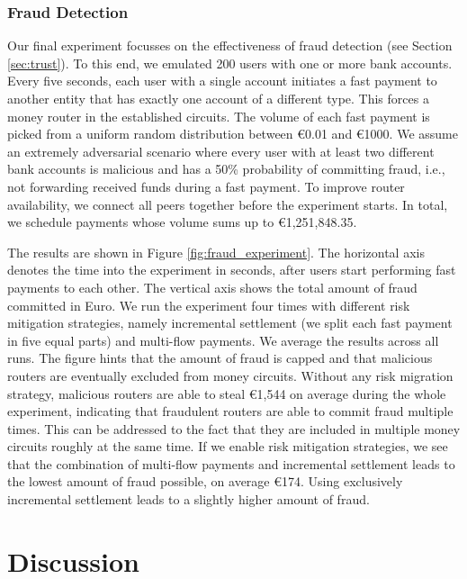 \subsubsection*{Fraud Detection}
\label{sec:fraud_experiment}
Our final experiment focusses on the effectiveness of fraud detection (see Section \ref{sec:trust}). %
To this end, we emulated 200 users with one or more bank accounts.
Every five seconds, each user with a single account initiates a fast payment to another entity that has exactly one account of a different type.
This forces a money router in the established circuits.
The volume of each fast payment is picked from a uniform random distribution between \euro 0.01 and \euro 1000.
We assume an extremely adversarial scenario where every user with at least two different bank accounts is malicious and has a 50\% probability of committing fraud, i.e., not forwarding received funds during a fast payment.
To improve router availability, we connect all peers together before the experiment starts.
In total, we schedule payments whose volume sums up to \euro 1,251,848.35.

The results are shown in Figure \ref{fig:fraud_experiment}.
The horizontal axis denotes the time into the experiment in seconds, after users start performing fast payments to each other.
The vertical axis shows the total amount of fraud committed in Euro.
We run the experiment four times with different risk mitigation strategies, namely incremental settlement (we split each fast payment in five equal parts) and multi-flow payments.
We average the results across all runs.
The figure hints that the amount of fraud is capped and that malicious routers are eventually excluded from money circuits.
Without any risk migration strategy, malicious routers are able to steal \euro 1,544 on average during the whole experiment, indicating that fraudulent routers are able to commit fraud multiple times.
This can be addressed to the fact that they are included in multiple money circuits roughly at the same time. 
If we enable risk mitigation strategies, we see that the combination of multi-flow payments and incremental settlement leads to the lowest amount of fraud possible, on average \euro 174.
Using exclusively incremental settlement leads to a slightly higher amount of fraud.

\section{Discussion}
\label{sec:discussion}


